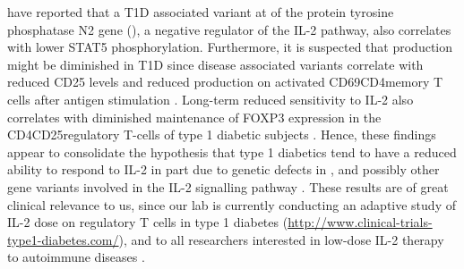 \citet{Long:2011hk} have reported that a \Gls{T1D} associated variant at 
of the protein tyrosine phosphatase N2 gene (),
a negative regulator of the IL-2 pathway,
also correlates with lower STAT5 phosphorylation.
Furthermore, it is suspected that  production might be diminished in T1D since disease associated  variants 
correlate with reduced CD25 levels 
and reduced  production
on activated CD69\positive CD4\positive memory T cells
after antigen stimulation \citep{Dendrou:2009dv}.
Long-term reduced sensitivity to IL-2 also correlates with diminished maintenance 
of FOXP3 expression in the CD4\positive CD25\positive regulatory T-cells of type 1 diabetic subjects \citep{Long:2010ej}.
Hence, these findings appear to consolidate the hypothesis that type 1 diabetics tend to have a reduced ability to respond to IL-2
in part due to genetic defects in ,  and possibly other gene variants involved in the IL-2 signalling pathway
\citep{Long:2010ej,Long:2011hk,Long:2012ea}.
These results are of great clinical relevance to us,
since our lab is currently conducting an
adaptive study of IL-2 dose on regulatory T cells in type 1 diabetes (\url{http://www.clinical-trials-type1-diabetes.com/}),
and to all researchers interested in low-dose IL-2 therapy to autoimmune diseases \citep{Koreth:2011kv,Saadoun:2011em}.

